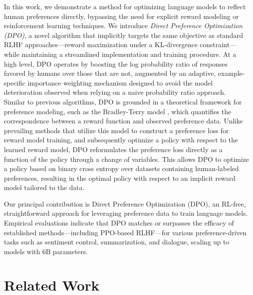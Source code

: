 In this work, we demonstrate a method for optimizing language models to reflect human preferences directly, bypassing the need for explicit reward modeling or reinforcement learning techniques. We introduce \textit{{Direct Preference Optimization} (DPO)}, a novel algorithm that implicitly targets the same objective as standard RLHF approaches—reward maximization under a KL-divergence constraint—while maintaining a streamlined implementation and training procedure. At a high level, DPO operates by boosting the log probability ratio of responses favored by humans over those that are not, augmented by an adaptive, example-specific importance weighting mechanism designed to avoid the model deterioration observed when relying on a naive probability ratio approach. Similar to previous algorithms, DPO is grounded in a theoretical framework for preference modeling, such as the Bradley-Terry model \cite{bradley1952rankanalysis}, which quantifies the correspondence between a reward function and observed preference data. Unlike prevailing methods that utilize this model to construct a preference loss for reward model training, and subsequently optimize a policy with respect to the learned reward model, DPO reformulates the preference loss directly as a function of the policy through a change of variables. This allows DPO to optimize a policy based on binary cross entropy over datasets containing human-labeled preferences, resulting in the optimal policy with respect to an implicit reward model tailored to the data.

Our principal contribution is Direct Preference Optimization (DPO), an RL-free, straightforward approach for leveraging preference data to train language models. Empirical evaluations indicate that DPO matches or surpasses the efficacy of established methods—including PPO-based RLHF—for various preference-driven tasks such as sentiment control, summarization, and dialogue, scaling up to models with 6B parameters.

\section{Related Work}

